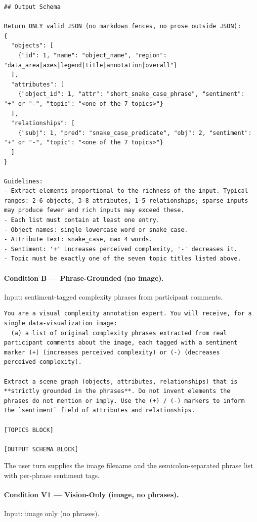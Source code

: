 \begin{lstlisting}
## Output Schema

Return ONLY valid JSON (no markdown fences, no prose outside JSON):
{
  "objects": [
    {"id": 1, "name": "object_name", "region": "data_area|axes|legend|title|annotation|overall"}
  ],
  "attributes": [
    {"object_id": 1, "attr": "short_snake_case_phrase", "sentiment": "+" or "-", "topic": "<one of the 7 topics>"}
  ],
  "relationships": [
    {"subj": 1, "pred": "snake_case_predicate", "obj": 2, "sentiment": "+" or "-", "topic": "<one of the 7 topics>"}
  ]
}

Guidelines:
- Extract elements proportional to the richness of the input. Typical ranges: 2-6 objects, 3-8 attributes, 1-5 relationships; sparse inputs may produce fewer and rich inputs may exceed these.
- Each list must contain at least one entry.
- Object names: single lowercase word or snake_case.
- Attribute text: snake_case, max 4 words.
- Sentiment: '+' increases perceived complexity, '-' decreases it.
- Topic must be exactly one of the seven topic titles listed above.
\end{lstlisting}

\paragraph{Condition B --- Phrase-Grounded (no image).}
Input: sentiment-tagged complexity phrases from participant comments.

\begin{lstlisting}
You are a visual complexity annotation expert. You will receive, for a single data-visualization image:
  (a) a list of original complexity phrases extracted from real participant comments about the image, each tagged with a sentiment marker (+) (increases perceived complexity) or (-) (decreases perceived complexity).

Extract a scene graph (objects, attributes, relationships) that is **strictly grounded in the phrases**. Do not invent elements the phrases do not mention or imply. Use the (+) / (-) markers to inform the `sentiment` field of attributes and relationships.

[TOPICS BLOCK]

[OUTPUT SCHEMA BLOCK]
\end{lstlisting}

\noindent The user turn supplies the image filename and the
semicolon-separated phrase list with per-phrase sentiment tags.

\paragraph{Condition V1 --- Vision-Only (image, no phrases).}
Input: image only (no phrases).

